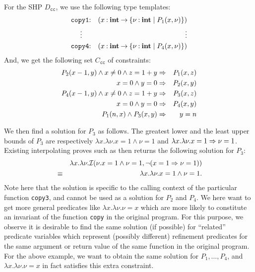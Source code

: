 For the SHP \(D_{\texttt{cc}}\), we use the following type templates:
\begin{eqnarray*}
\texttt{copy1}&\mathbin{:}&(x\mathbin{:}{\mathbf{int}}\mathbin{\rightarrow}{\{{\nu\mathbin{:}\mathbf{int} \mid P_1(x,\nu)}\}}) \\
\vdots\quad &&\qquad\qquad \vdots \\
\texttt{copy4}&\mathbin{:}&(x\mathbin{:}{\mathbf{int}}\mathbin{\rightarrow}{\{{\nu\mathbin{:}\mathbf{int} \mid P_4(x,\nu)}\}})
\end{eqnarray*}
And, we get the following set \(C_{\texttt{cc}}\) of constraints:
\begin{eqnarray*}
P_2(x-1,y) \land x\neq0 \land z=1+y &\Rightarrow& P_1(x,z) \\
x=0 \land y=0 &\Rightarrow& P_2(x,y) \\
P_4(x-1,y) \land x\neq0 \land z=1+y &\Rightarrow& P_3(x,z) \\
x=0 \land y=0 &\Rightarrow& P_4(x,y) \\
P_1(n,x) \land P_3(x,y) &\Rightarrow& y=n
\end{eqnarray*}

We then find a solution for \(P_3\) as follows.  The greatest lower and
the least upper bounds of \(P_3\) are respectively \(\lambda x.\lambda
\nu.x=1 \land \nu=1\) and \(\lambda x.\lambda \nu.x=1 \Rightarrow \nu=1\).
%
Existing interpolating proves such as \cite{Beyer2008} then returns the
following solution for \(P_3\):
\begin{eqnarray*}
&&\lambda x.\lambda \nu.\mathcal{I}(\nu.x=1 \land \nu=1,\neg (x=1 \Rightarrow \nu=1)) \\
&\equiv& \lambda x.\lambda \nu.x=1 \land \nu=1.
\end{eqnarray*}
Note here that the solution is specific to the calling context of the
particular function \texttt{copy3}, and cannot be used as a solution for
\(P_2\) and \(P_4\).  We here want to get more general predicates like
\(\lambda x.\lambda \nu.\nu=x\) which are more likely to constitute an invariant
of the function \texttt{copy} in the original program.  For this purpose,
we observe it is desirable to find the same solution (if possible) for
``related'' predicate variables which represent (possibly different)
refinement predicates for the same argument or return value of the same
function in the original program.  For the above example, we want to
obtain the same solution for \(P_1,\dots,P_4\), and \(\lambda
x.\lambda \nu.\nu=x\) in fact satisfies this extra constraint.

